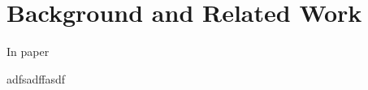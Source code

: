 \section{Background and Related Work}
\label{sec:background}

In paper \cite{vipin2019}

adfsadffasdf